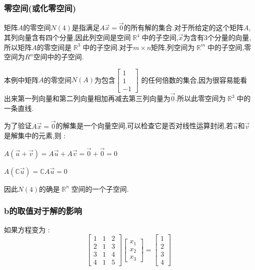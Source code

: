 \documentclass[UTF8,12pt]{ctexbook}
\newcommand{\mathConstant}{\mathbb{C}}
\DeclareMathOperator{\mathRealNumberCollection}{\mathbb{R}}
\begin{document}
{{{{\subsubsection{零空间(或化零空间)}{
  矩阵$A$的零空间$N(4)$是指满足$A\vec{x} = \vec{0}$的所有解的集合.对于所给定的这个矩阵$A$,其列向量含有四个分量,因此列空间是空间$\mathRealNumberCollection^4$中的子空间,$\vec{x}$为含有3个分量的向量,所以矩阵$A$的零空间是$\mathRealNumberCollection^3$中的子空间.对于$m \times n$矩阵,列空间为$\mathRealNumberCollection^m$中的子空间,零空间为$R^n$空间中的子空间.

  本例中矩阵$A$的零空间$N(A)$为包含$\begin{bmatrix}
      1 \\
      1 \\
      -1
    \end{bmatrix}$
  的任何倍数的集合,因为很容易能看出来第一列向量和第二列向量相加再减去第三列向量为$\vec{0}$.所以此零空间为$\mathRealNumberCollection^3$中的一条直线.

  为了验证$A\vec{x} = \vec{0}$的解集是一个向量空间,可以检查它是否对线性运算封闭,若$\vec{u}$和$\vec{v}$是解集中的元素,则 :

  \begin{center}
    $A(\vec{u} + \vec{v}) = A\vec{u} + A\vec{v} = \vec{0} + \vec{0} = 0$

    $A(\mathConstant\vec{u}) = \mathConstant A\vec{u} = 0$
  \end{center}

  因此$N(4)$的确是$\mathRealNumberCollection^n$空间的一个子空间.
}%

\subsubsection{b的取值对于解的影响}{
  如果方程变为 : $$
    \begin{bmatrix}
      1 & 1 & 2 \\
      2 & 1 & 3 \\
      3 & 1 & 4 \\
      4 & 1 & 5
    \end{bmatrix}
    \begin{bmatrix}
      x_1 \\
      x_2 \\
      x_3
    \end{bmatrix}
    =
    \begin{bmatrix}
      1 \\
      2 \\
      3 \\
      4
    \end{bmatrix}
  $$

}}}}}
\end{document}
